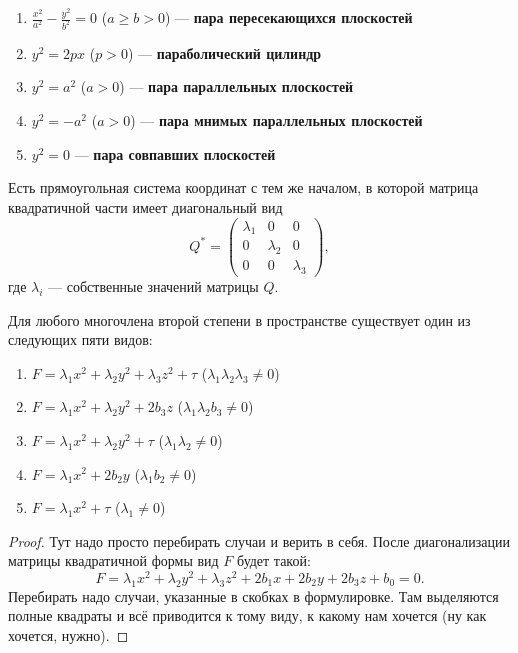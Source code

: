 \begin{theorem}
\begin{enumerate}
        \item $\displaystyle\frac{x^2}{a^2} - \frac{y^2}{b^2} = 0$ ($a \geqslant b > 0$) --- \textbf{пара пересекающихся плоскостей}
        \item $\displaystyle y^2 = 2px$ ($p > 0$) --- \textbf{параболический цилиндр}
        \item $\displaystyle y^2 = a^2$ ($a > 0$) --- \textbf{пара параллельных плоскостей}
        \item $\displaystyle y^2 = -a^2$ ($a > 0$) --- \textbf{пара мнимых параллельных плоскостей}
        \item $\displaystyle y^2 = 0$ --- \textbf{пара совпавших плоскостей}
    \end{enumerate}
\end{theorem}

\begin{theorem}
    Есть прямоугольная система координат с тем же началом, в которой матрица квадратичной части имеет диагональный вид
    $$
    Q^\ast =
    \begin{pmatrix}
        \lambda_1 & 0 & 0\\
        0 & \lambda_2 & 0\\
        0 & 0 & \lambda_3
    \end{pmatrix},
    $$
    где $\lambda_i$ --- собственные значений матрицы $Q$.
\end{theorem}

\begin{lemma}
    Для любого многочлена второй степени в пространстве существует один из следующих пяти видов:
    \begin{enumerate}
        \item $F = \lambda_1x^2 + \lambda_2y^2 + \lambda_3z^2 + \tau$ ($\lambda_1\lambda_2\lambda_3 \ne 0$)
        \item $F = \lambda_1x^2 + \lambda_2y^2 + 2b_3z$ ($\lambda_1\lambda_2b_3 \ne 0$)
        \item $F = \lambda_1x^2 + \lambda_2y^2 + \tau$ ($\lambda_1\lambda_2 \ne 0$)
        \item $F = \lambda_1x^2 + 2b_2y$ ($\lambda_1b_2 \ne 0$)
        \item $F = \lambda_1x^2 + \tau$ ($\lambda_1 \ne 0$)
    \end{enumerate}
\end{lemma}

\begin{proof}
    Тут надо просто перебирать случаи и верить в себя. После диагонализации матрицы квадратичной формы вид $F$ будет такой:
    $$
    F = \lambda_1x^2 + \lambda_2y^2 + \lambda_3z^2 + 2b_1x + 2b_2y + 2b_3z + b_0 = 0.
    $$
    Перебирать надо случаи, указанные в скобках в формулировке. Там выделяются полные квадраты и всё приводится к тому виду, к какому нам хочется (ну как хочется, нужно).
\end{proof}

